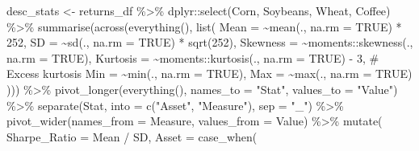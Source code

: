 \documentclass[
  10pt,
  a4paper,
]{article}
\newenvironment{Shaded}{\begin{snugshade}}{\end{snugshade}}
\newcommand{\AttributeTok}[1]{\textcolor[rgb]{0.40,0.45,0.13}{#1}}
\newcommand{\CommentTok}[1]{\textcolor[rgb]{0.37,0.37,0.37}{#1}}
\newcommand{\ConstantTok}[1]{\textcolor[rgb]{0.56,0.35,0.01}{#1}}
\newcommand{\DecValTok}[1]{\textcolor[rgb]{0.68,0.00,0.00}{#1}}
\newcommand{\FunctionTok}[1]{\textcolor[rgb]{0.28,0.35,0.67}{#1}}
\newcommand{\NormalTok}[1]{\textcolor[rgb]{0.00,0.23,0.31}{#1}}
\newcommand{\OtherTok}[1]{\textcolor[rgb]{0.00,0.23,0.31}{#1}}
\newcommand{\SpecialCharTok}[1]{\textcolor[rgb]{0.37,0.37,0.37}{#1}}
\newcommand{\StringTok}[1]{\textcolor[rgb]{0.13,0.47,0.30}{#1}}
\begin{document}
\begin{Shaded}
\begin{Highlighting}[]
\NormalTok{desc\_stats }\OtherTok{\textless{}{-}}\NormalTok{ returns\_df }\SpecialCharTok{\%\textgreater{}\%}
\NormalTok{  dplyr}\SpecialCharTok{::}\FunctionTok{select}\NormalTok{(Corn, Soybeans, Wheat, Coffee) }\SpecialCharTok{\%\textgreater{}\%}
  \FunctionTok{summarise}\NormalTok{(}\FunctionTok{across}\NormalTok{(}\FunctionTok{everything}\NormalTok{(), }\FunctionTok{list}\NormalTok{(}
    \AttributeTok{Mean =} \SpecialCharTok{\textasciitilde{}}\FunctionTok{mean}\NormalTok{(., }\AttributeTok{na.rm =} \ConstantTok{TRUE}\NormalTok{) }\SpecialCharTok{*} \DecValTok{252}\NormalTok{,}
    \AttributeTok{SD =} \SpecialCharTok{\textasciitilde{}}\FunctionTok{sd}\NormalTok{(., }\AttributeTok{na.rm =} \ConstantTok{TRUE}\NormalTok{) }\SpecialCharTok{*} \FunctionTok{sqrt}\NormalTok{(}\DecValTok{252}\NormalTok{),}
    \AttributeTok{Skewness =} \SpecialCharTok{\textasciitilde{}}\NormalTok{moments}\SpecialCharTok{::}\FunctionTok{skewness}\NormalTok{(., }\AttributeTok{na.rm =} \ConstantTok{TRUE}\NormalTok{),}
    \AttributeTok{Kurtosis =} \SpecialCharTok{\textasciitilde{}}\NormalTok{moments}\SpecialCharTok{::}\FunctionTok{kurtosis}\NormalTok{(., }\AttributeTok{na.rm =} \ConstantTok{TRUE}\NormalTok{) }\SpecialCharTok{{-}} \DecValTok{3}\NormalTok{, }\CommentTok{\# Excess kurtosis}
    \AttributeTok{Min =} \SpecialCharTok{\textasciitilde{}}\FunctionTok{min}\NormalTok{(., }\AttributeTok{na.rm =} \ConstantTok{TRUE}\NormalTok{),}
    \AttributeTok{Max =} \SpecialCharTok{\textasciitilde{}}\FunctionTok{max}\NormalTok{(., }\AttributeTok{na.rm =} \ConstantTok{TRUE}\NormalTok{)}
\NormalTok{  ))) }\SpecialCharTok{\%\textgreater{}\%}
  \FunctionTok{pivot\_longer}\NormalTok{(}\FunctionTok{everything}\NormalTok{(), }\AttributeTok{names\_to =} \StringTok{"Stat"}\NormalTok{, }\AttributeTok{values\_to =} \StringTok{"Value"}\NormalTok{) }\SpecialCharTok{\%\textgreater{}\%}
  \FunctionTok{separate}\NormalTok{(Stat, }\AttributeTok{into =} \FunctionTok{c}\NormalTok{(}\StringTok{"Asset"}\NormalTok{, }\StringTok{"Measure"}\NormalTok{), }\AttributeTok{sep =} \StringTok{"\_"}\NormalTok{) }\SpecialCharTok{\%\textgreater{}\%}
  \FunctionTok{pivot\_wider}\NormalTok{(}\AttributeTok{names\_from =}\NormalTok{ Measure, }\AttributeTok{values\_from =}\NormalTok{ Value) }\SpecialCharTok{\%\textgreater{}\%}
  \FunctionTok{mutate}\NormalTok{(}
    \AttributeTok{Sharpe\_Ratio =}\NormalTok{ Mean }\SpecialCharTok{/}\NormalTok{ SD,}
    \AttributeTok{Asset =} \FunctionTok{case\_when}\NormalTok{(}

\end{Highlighting}
\end{Shaded}
\end{document}
